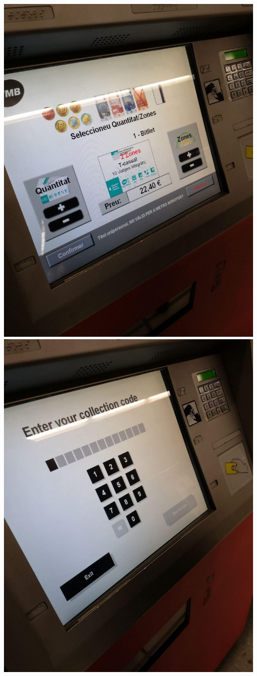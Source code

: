 \documentclass{../../myassignment}
\begin{document}
	\includegraphics[scale=0.2]{pictures/payment.jpg}
	\includegraphics[scale=0.2]{pictures/onlinepurchase.jpg}\\
\end{document}

